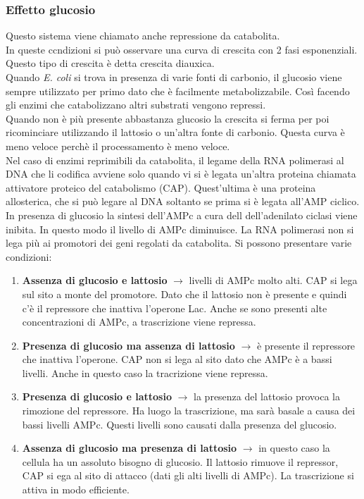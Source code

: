 \subsubsection{Effetto glucosio}
Questo sistema viene chiamato anche repressione da catabolita.
\\In queste ccndizioni si può osservare una curva di crescita con 2 fasi esponenziali. Questo tipo di crescita è detta crescita diauxica. 
\\Quando \textit{E. coli} si trova in presenza di varie fonti di carbonio, il glucosio viene sempre utilizzato per primo dato che è facilmente metabolizzabile. Così facendo gli enzimi che catabolizzano altri substrati vengono repressi. 
\\Quando non è più presente abbastanza glucosio la crescita si ferma per poi ricominciare utilizzando il lattosio o un'altra fonte di carbonio. Questa curva è meno veloce perchè il processamento è meno veloce. 
\\Nel caso di enzimi reprimibili da catabolita, il legame della RNA polimerasi al DNA che li codifica avviene solo quando vi si è legata un'altra proteina chiamata attivatore proteico del catabolismo (CAP). Quest'ultima è una proteina allosterica, che si può legare al DNA soltanto se prima si è legata all'AMP ciclico. 
\\In presenza di glucosio la sintesi dell'AMPc a cura dell dell'adenilato ciclasi viene inibita. In questo modo il livello di AMPc diminuisce. La RNA polimerasi non si lega più ai promotori dei geni regolati da catabolita. 
Si possono presentare varie condizioni:
\begin{enumerate}
    \item \textbf{Assenza di glucosio e lattosio} $\xrightarrow{}$ livelli di AMPc molto alti. CAP si lega sul sito a monte del promotore. Dato che il lattosio non è presente e quindi c'è il repressore che inattiva l'operone Lac. Anche se sono presenti alte concentrazioni di AMPc, a trascrizione viene repressa. 
    \item \textbf{Presenza di glucosio ma assenza di  lattosio} $\xrightarrow{}$ è presente il repressore che inattiva l'operone. CAP non si lega al sito dato che AMPc è a bassi livelli. Anche in questo caso la tracrizione viene repressa.
    \item \textbf{Presenza di glucosio e lattosio} $\xrightarrow{}$ la presenza del lattosio provoca la rimozione del repressore. Ha luogo la trascrizione, ma sarà basale a causa dei bassi livelli AMPc. Questi livelli sono causati dalla presenza del glucosio. 
    \item \textbf{Assenza di glucosio ma presenza di lattosio} $\xrightarrow{}$ in questo caso la cellula ha un assoluto bisogno di glucosio. Il lattosio rimuove il repressor, CAP si ega al sito di attacco (dati gli alti livelli di AMPc). La trascrizione si attiva in modo efficiente.
\end{enumerate}
